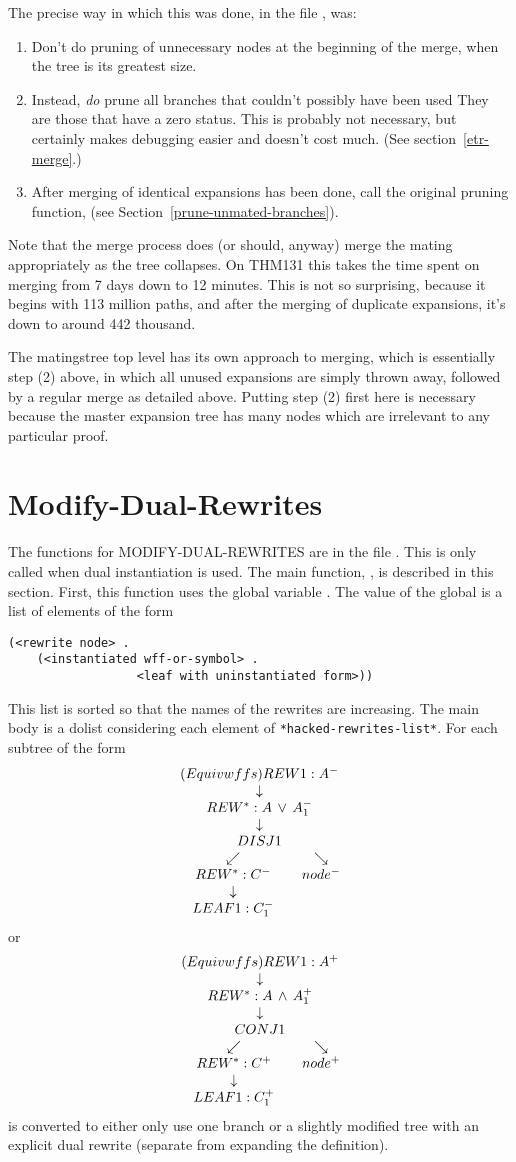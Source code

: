 The precise way in which this was done, in the file {\it{}}, was:
\begin{enumerate}
\item Don't do pruning of unnecessary nodes at the beginning of the merge,
when the tree is its greatest size. 

\item Instead, {\it do} prune all branches that couldn't possibly have been used 
They are those that have a zero status. This is probably not necessary,
but certainly makes debugging easier and doesn't cost much.  (See section~\ref{etr-merge}.)

\item After merging of identical expansions has been done, call the original
pruning function,  (see Section~\ref{prune-unmated-branches}).
\end{enumerate}

Note that the merge process does (or should, anyway) merge the mating 
appropriately as the tree collapses.
On THM131 this takes the time spent on merging from 7 days down to 12 minutes.
This is not so surprising, because it begins with 113 million paths, and after
the merging of duplicate expansions, it's down to around 442 thousand. 

The matingstree top level has its own approach to merging, which is essentially
step (2) above, in which all unused 
expansions are simply thrown away, followed by a regular merge as detailed above. 
Putting step (2) first here 
is necessary because the master expansion tree has many nodes which are irrelevant to any particular proof.

\section{Modify-Dual-Rewrites}\label{modify-dual-rewrites}

The functions for MODIFY-DUAL-REWRITES are in
the file {\it{}}.  This is
only called when dual instantiation is used.
The main function, ,
is described in this section.
First, this function uses the global variable
.  The value
of the global is a list of elements of the form
\begin{verbatim}
(<rewrite node> . 
    (<instantiated wff-or-symbol> . 
                  <leaf with uninstantiated form>))
\end{verbatim}
This list is sorted so that the names of the rewrites are increasing.
The main body is a dolist considering each element of \verb+*hacked-rewrites-list*+.
For each subtree of the form
$$\erew{1}{Equivwffs}{A^-}{\erewstar{}{A\,\lor\, A_1^-}{\edisj{1}{C \, \land \, D^-}{\erewstar{}{C^-}{\eleaf{1}{C_1^-}}}{node^-}}}$$
or 
$$\erew{1}{Equivwffs}{A^+}{\erewstar{}{A\,\land\, A_1^+}{\econj{1}{C \, \land \, D^+}{\erewstar{}{C^+}{\eleaf{1}{C_1^+}}}{node^+}}}$$
is converted to either only use one branch or a slightly modified
tree with an explicit dual rewrite (separate from expanding the definition).

